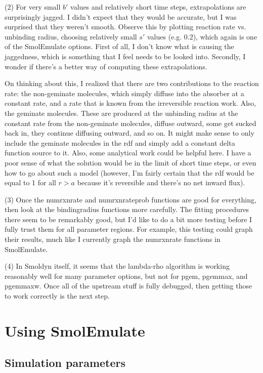 \documentclass {book}
\begin{document}
(2) For very small $b'$ values and relatively short time steps, extrapolations are surprisingly jagged. I didn't expect that they would be accurate, but I was surprised that they weren't smooth. Observe this by plotting reaction rate vs. unbinding radius, choosing relatively small $s'$ values (e.g. 0.2), which again is one of the SmolEmulate options. First of all, I don't know what is causing the jaggedness, which is something that I feel needs to be looked into. Secondly, I wonder if there's a better way of computing these extrapolations.

On thinking about this, I realized that there are two contributions to the reaction rate: the non-geminate molecules, which simply diffuse into the absorber at a constant rate, and a rate that is known from the irreversible reaction work. Also, the geminate molecules. These are produced at the unbinding radius at the constant rate from the non-geminate molecules, diffuse outward, some get sucked back in, they continue diffusing outward, and so on. It might make sense to only include the geminate molecules in the rdf and simply add a constant delta function source to it. Also, some analytical work could be helpful here. I have a poor sense of what the solution would be in the limit of short time steps, or even how to go about such a model (however, I'm fairly certain that the rdf would be equal to 1 for all $r>a$ because it's reversible and there's no net inward flux).

(3) Once the numrxnrate and numrxnrateprob functions are good for everything, then look at the bindingradius functions more carefully. The fitting procedures there seem to be remarkably good, but I'd like to do a bit more testing before I fully trust them for all parameter regions. For example, this testing could graph their results, much like I currently graph the numrxnrate functions in SmolEmulate.

(4) In Smoldyn itself, it seems that the lambda-rho algorithm is working reasonably well for many parameter options, but not for pgem, pgemmax, and pgemmaxw. Once all of the upstream stuff is fully debugged, then getting those to work correctly is the next step.


\chapter{Using SmolEmulate}

\section{Simulation parameters}
\end{document}
